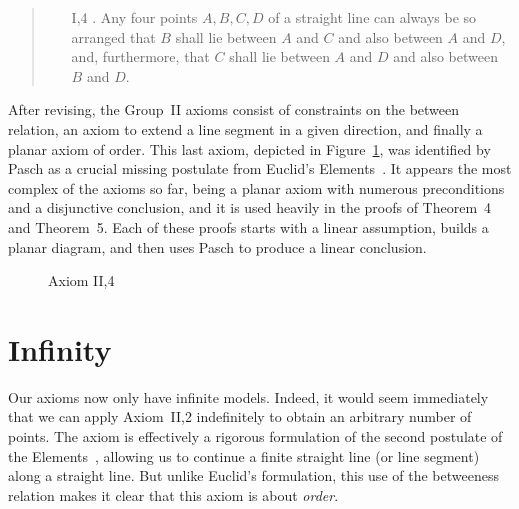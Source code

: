 \begin{quote}
  \begin{enumerate}
  \item[I,4]. Any four points $A, B, C, D$ of a straight line can always be so arranged that $B$ shall lie between $A$ and $C$ and also between $A$ and $D$, and, furthermore, that $C$ shall lie between $A$ and $D$ and also between $B$ and $D$.
  \end{enumerate}
\end{quote}

After revising, the Group~II axioms consist of constraints on the between relation, an axiom to extend a line segment in a given direction, and finally a planar axiom of order. This last axiom, depicted in Figure~\ref{fig:PaschDiagram}, was identified by Pasch as a crucial missing postulate from Euclid's Elements~\cite{Heath?}. It appears the most complex of the axioms so far, being a planar axiom with numerous preconditions and a disjunctive conclusion, and it is used heavily in the proofs of Theorem~4 and Theorem~5. Each of these proofs starts with a linear assumption, builds a planar diagram, and then uses Pasch to produce a linear conclusion.

\begin{figure}
\caption{Axiom II,4}
\label{fig:PaschDiagram}
\end{figure}

\section{Infinity}\label{sec:Infinity}
Our axioms now only have infinite models. Indeed, it would seem immediately that we can apply Axiom~II,2 indefinitely to obtain an arbitrary number of points. The axiom is effectively a rigorous formulation of the second postulate of the Elements~\cite{Aleph0Elements}, allowing us to continue a finite straight line (or line segment) along a straight line. But unlike Euclid's formulation, this use of the betweeness relation makes it clear that this axiom is about \emph{order}. 

